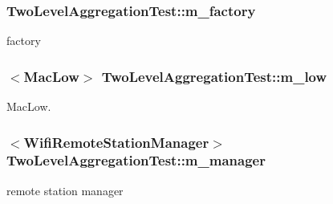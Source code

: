 \subsubsection[{\texorpdfstring{m\+\_\+factory}{m_factory}}]{ Two\+Level\+Aggregation\+Test\+::m\+\_\+factory\hspace{0.3cm}{\ttfamily [private]}}\hypertarget{classTwoLevelAggregationTest_a5b0df48a92f6160fbdf46911f2dc6e26}{}\label{classTwoLevelAggregationTest_a5b0df48a92f6160fbdf46911f2dc6e26}


factory 

\subsubsection[{\texorpdfstring{m\+\_\+low}{m_low}}]{$<${\bf Mac\+Low}$>$ Two\+Level\+Aggregation\+Test\+::m\+\_\+low\hspace{0.3cm}{\ttfamily [private]}}\hypertarget{classTwoLevelAggregationTest_a408234bde940ec7a7a61112d512f7a63}{}\label{classTwoLevelAggregationTest_a408234bde940ec7a7a61112d512f7a63}


Mac\+Low. 

\subsubsection[{\texorpdfstring{m\+\_\+manager}{m_manager}}]{$<${\bf Wifi\+Remote\+Station\+Manager}$>$ Two\+Level\+Aggregation\+Test\+::m\+\_\+manager\hspace{0.3cm}{\ttfamily [private]}}\hypertarget{classTwoLevelAggregationTest_a118997e06775ec177507bbf2dec94e2c}{}\label{classTwoLevelAggregationTest_a118997e06775ec177507bbf2dec94e2c}


remote station manager 

